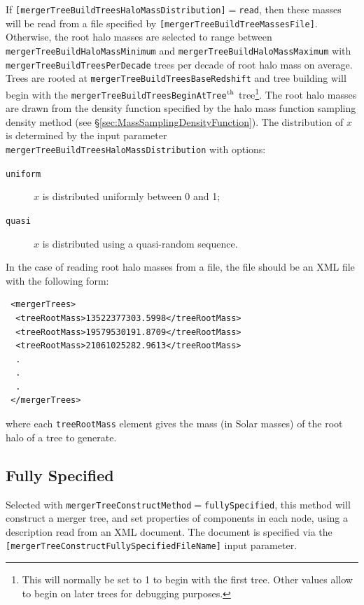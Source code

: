 If {\tt [mergerTreeBuildTreesHaloMassDistribution]}$=${\tt read}, then these masses will be read from a file specified by {\tt [mergerTreeBuildTreeMassesFile]}. Otherwise, the root halo masses are selected to range between {\tt mergerTreeBuildHaloMassMinimum} and {\tt mergerTreeBuildHaloMassMaximum} with {\tt mergerTreeBuildTreesPerDecade} trees per decade of root halo mass on average. Trees are rooted at {\tt mergerTreeBuildTreesBaseRedshift} and tree building will begin with the {\tt mergerTreeBuildTreesBeginAtTree}$^{\rm th}$ tree\footnote{This will normally be set to 1 to begin with the first tree. Other values allow to begin on later trees for debugging purposes.}. The root halo masses are drawn from the density function specified by the halo mass function sampling density method (see \S\ref{sec:MassSamplingDensityFunction}). The distribution of $x$ is determined by the input parameter {\tt mergerTreeBuildTreesHaloMassDistribution} with options:
\begin{description}
 \item [{\tt uniform}] $x$ is distributed uniformly between 0 and 1;
 \item [{\tt quasi}] $x$ is distributed using a quasi-random sequence.
\end{description}

In the case of reading root halo masses from a file, the file should be an XML file with the following form:
\begin{verbatim}
 <mergerTrees>
  <treeRootMass>13522377303.5998</treeRootMass>
  <treeRootMass>19579530191.8709</treeRootMass>
  <treeRootMass>21061025282.9613</treeRootMass>
  .
  .
  .
 </mergerTrees>
\end{verbatim}
where each {\tt treeRootMass} element gives the mass (in Solar masses) of the root halo of a tree to generate.

\subsection{Fully Specified}\label{sec:TreeConstructFullySpecified}

Selected with {\tt mergerTreeConstructMethod}$=${\tt fullySpecified}, this method will construct a merger tree, and set properties of components in each node, using a description read from an XML document. The document is specified via the {\tt [mergerTreeConstructFullySpecifiedFileName]} input parameter.

